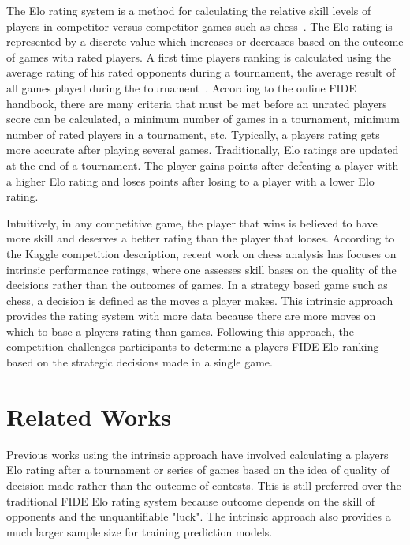 \documentclass{acm_proc_article-sp}
\begin{document}
The Elo rating system is a method for calculating the relative skill levels of players in competitor-versus-competitor games such as
chess~\cite{ELO}.%
The Elo rating is represented by a discrete value which increases or decreases based on the outcome of games with rated players. A first time players ranking is calculated using the average rating of his rated opponents during a tournament, the average result of all games played during the tournament~\cite{FIDE}.%
According to the online FIDE handbook, there are many criteria that must be met before an unrated players score can be calculated, a minimum number of games in a tournament, minimum number of rated players in a tournament, etc. Typically, a players rating gets more accurate after playing several games. Traditionally, Elo ratings are updated at the end of a tournament. The player gains points after defeating a player with a higher Elo rating and loses points after losing to a player with a lower Elo rating.

Intuitively, in any competitive game, the player that wins is believed to have more skill and deserves a better rating than the player that looses. According to the Kaggle competition description, recent work on chess analysis has focuses on intrinsic performance ratings, where one assesses skill bases on the quality of the decisions rather than the outcomes of games. In a strategy based game such as chess, a decision is defined as the moves a player makes. This intrinsic approach provides the rating system with more data because there are more moves on which to base a players rating than games. Following this approach, the competition challenges participants to determine a players FIDE Elo ranking based on the strategic decisions made in a single game. 

\section{Related Works}
Previous works using the intrinsic approach have involved calculating a players Elo rating after a tournament or series of games based on the idea of quality of decision made rather than the outcome of contests.%
This is still preferred over the traditional FIDE Elo rating system because outcome depends on the skill of opponents and the unquantifiable "luck". The intrinsic approach also provides a much larger sample size for training prediction models. 
\end{document}

